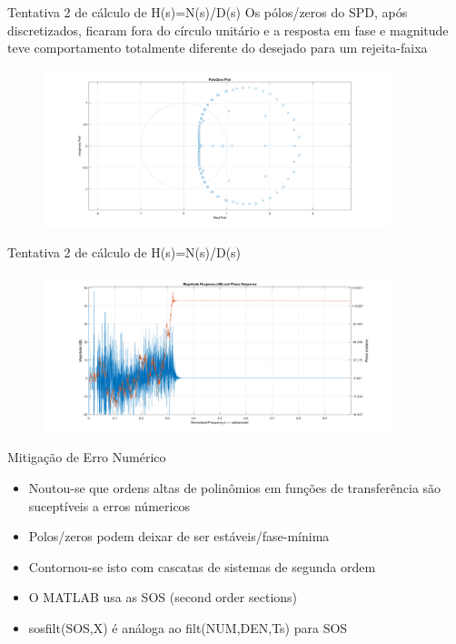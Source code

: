 \begin{frame}{Tentativa 2 de cálculo de H(s)=N(s)/D(s)}
    Os pólos/zeros do SPD, após discretizados, ficaram fora do círculo unitário e a resposta em fase e magnitude teve comportamento totalmente diferente do desejado para um rejeita-faixa
    \begin{figure}[!htb]
    \includegraphics[width=0.9\textwidth]{graficos/zp_b_inst.PNG}
    \end{figure} 
\end{frame}
\begin{frame}{Tentativa 2 de cálculo de H(s)=N(s)/D(s)}
    \begin{figure}[!htb]
    \includegraphics[width=0.9\textwidth]{graficos/mag_pha_b_inst.PNG}
    \end{figure} 
\end{frame}

\begin{frame}{Mitigação de Erro Numérico}
    \begin{itemize}
        \item Noutou-se que ordens altas de polinômios em funções de transferência são suceptíveis a erros númericos
        \item Polos/zeros podem deixar de ser estáveis/fase-mínima
        \item Contornou-se isto com cascatas de sistemas de segunda ordem
        \item O MATLAB usa as SOS (second order sections)
        \item sosfilt(SOS,X) é análoga ao filt(NUM,DEN,Ts) para SOS
    \end{itemize}

\end{frame}

